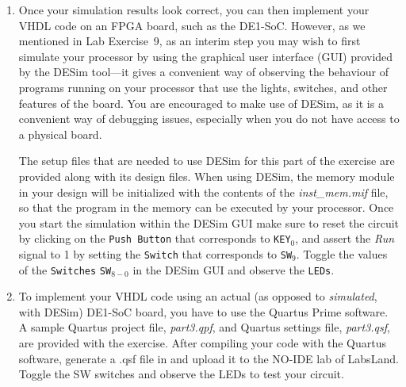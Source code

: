 \documentclass[epsfig,10pt,fullpage]{article} \addtolength{\textwidth}{1.5in}
\begin{document}
\begin{enumerate}
\lstset{language=ASM,numbers=none,escapechar=|}
\begin{figure}[H]
\begin{center}
\begin{minipage}[h]{12.5 cm}
\begin{lstlisting}[name=proc]
|\label{line:module}|.define LED_ADDRESS 0x10
.define SW_ADDRESS 0x30

// Read SW switches and display on LEDs
			mvt	r3, #LED_ADDRESS	// point to LED port
			mvt	r4, #SW_ADDRESS	// point to SW port
MAIN:		ld		r0, [r4]				// read SW values
			st		r0, [r3]				// light up LEDs
			mv 	pc, #MAIN
\end{lstlisting}
\end{minipage}
\caption{Assembly-language program that uses {\it ld} and {\it st} instructions.}
\label{fig:assembly}
\end{center}
\end{figure}

An example simulation result for a correctly-designed circuit 
is given in Figure~\ref{fig:part3}. It shows the execution of the first four instructions
in Figure~\ref{fig:assembly}.

\item Once your simulation results look correct, you can then implement your VHDL
code on an FPGA board, such as the DE1-SoC. However, as we mentioned in Lab Exercise~9, as
an interim step you may wish to first simulate your processor by using the graphical user
interface (GUI) provided by the DESim tool---it gives a convenient way of observing the behaviour 
of programs running on your processor that use the lights, switches, and other features of 
the board. You are encouraged to make use of DESim, as it
is a convenient way of debugging issues, especially when you do not have access to a 
physical board.

The setup files that are needed to use DESim for this part of the exercise are provided along
with its design files.  When using DESim, the memory module in your design will be initialized with
the contents of the {\it inst\_mem.mif} file, so that the program in the memory 
can be executed by your processor. Once you start the simulation within the DESim GUI make sure to 
reset the circuit by clicking on the \texttt{Push Button} that corresponds to
\texttt{KEY}$_0$, and assert the {\it Run} signal to 1 by setting the \texttt{Switch}
that corresponds to \texttt{SW}$_9$. Toggle the values of the \texttt{Switches}
\texttt{SW}$_{8-0}$ in the DESim GUI and observe the \texttt{LEDs}. 

\item
To implement your VHDL code using an actual (as opposed to {\it simulated}, with DESim) 
DE1-SoC board, you have to use the Quartus Prime software.
A sample Quartus project file, {\it part3.qpf}, and Quartus
settings file, {\it part3.qsf}, are provided with the exercise. After compiling your code 
with the Quartus software, generate a .qsf file in and upload it to the NO-IDE lab of LabsLand. Toggle the SW switches and observe the LEDs to test your circuit.
\end{enumerate}
\end{document}
